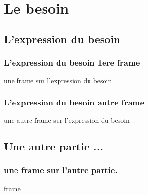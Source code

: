 \section{Le besoin}
\subsection{L'expression du besoin}
\begin{frame}
  \frametitle{\color{white} L'expression du besoin 1ere frame}
  une frame sur l'expression du besoin
\end{frame}
\begin{frame}
  \frametitle{\color{white} L'expression du besoin autre frame}
  une autre frame sur l'expression du besoin
\end{frame}
\subsection{Une autre partie ...}
\begin{frame}
  \frametitle{\color{white} une frame sur l'autre partie.}
  frame
\end{frame}

